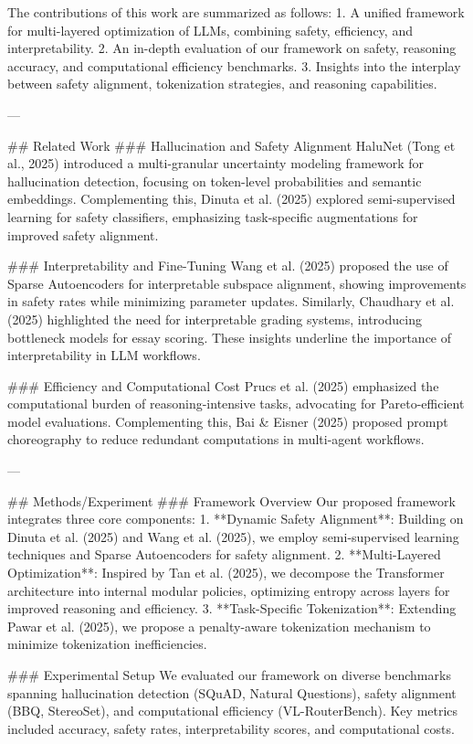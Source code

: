 The contributions of this work are summarized as follows:  
1. A unified framework for multi-layered optimization of LLMs, combining safety, efficiency, and interpretability.  
2. An in-depth evaluation of our framework on safety, reasoning accuracy, and computational efficiency benchmarks.  
3. Insights into the interplay between safety alignment, tokenization strategies, and reasoning capabilities.  

---

## Related Work  
### Hallucination and Safety Alignment  
HaluNet (Tong et al., 2025) introduced a multi-granular uncertainty modeling framework for hallucination detection, focusing on token-level probabilities and semantic embeddings. Complementing this, Dinuta et al. (2025) explored semi-supervised learning for safety classifiers, emphasizing task-specific augmentations for improved safety alignment.  

### Interpretability and Fine-Tuning  
Wang et al. (2025) proposed the use of Sparse Autoencoders for interpretable subspace alignment, showing improvements in safety rates while minimizing parameter updates. Similarly, Chaudhary et al. (2025) highlighted the need for interpretable grading systems, introducing bottleneck models for essay scoring. These insights underline the importance of interpretability in LLM workflows.  

### Efficiency and Computational Cost  
Prucs et al. (2025) emphasized the computational burden of reasoning-intensive tasks, advocating for Pareto-efficient model evaluations. Complementing this, Bai & Eisner (2025) proposed prompt choreography to reduce redundant computations in multi-agent workflows.  

---

## Methods/Experiment  
### Framework Overview  
Our proposed framework integrates three core components:  
1. **Dynamic Safety Alignment**: Building on Dinuta et al. (2025) and Wang et al. (2025), we employ semi-supervised learning techniques and Sparse Autoencoders for safety alignment.  
2. **Multi-Layered Optimization**: Inspired by Tan et al. (2025), we decompose the Transformer architecture into internal modular policies, optimizing entropy across layers for improved reasoning and efficiency.  
3. **Task-Specific Tokenization**: Extending Pawar et al. (2025), we propose a penalty-aware tokenization mechanism to minimize tokenization inefficiencies.  

### Experimental Setup  
We evaluated our framework on diverse benchmarks spanning hallucination detection (SQuAD, Natural Questions), safety alignment (BBQ, StereoSet), and computational efficiency (VL-RouterBench). Key metrics included accuracy, safety rates, interpretability scores, and computational costs.  

